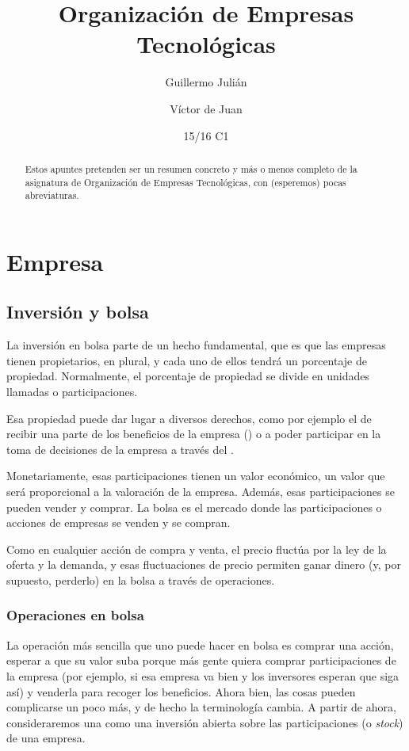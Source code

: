 \documentclass[nochap,palatino,notitlepage]{apuntes}
\title{Organización de Empresas Tecnológicas}
\author{Guillermo Julián \and Víctor de Juan}
\date{15/16 C1}
\begin{document}
\pagestyle{plain}
\maketitle

\begin{abstract}
Estos apuntes pretenden ser un resumen concreto y más o menos completo de la asignatura de Organización de Empresas Tecnológicas, con (esperemos) pocas abreviaturas.
\end{abstract}

\tableofcontents
\newpage
\section{Empresa}

\subsection{Inversión y bolsa}

La inversión en bolsa parte de un hecho fundamental, que es que las empresas tienen propietarios, en plural, y cada uno de ellos tendrá un porcentaje de propiedad. Normalmente, el porcentaje de propiedad se divide en unidades llamadas  o participaciones.

Esa propiedad puede dar lugar a diversos derechos, como por ejemplo el de recibir una parte de los beneficios de la empresa () o a poder participar en la toma de decisiones de la empresa a través del .

Monetariamente, esas participaciones tienen un valor económico, un valor que será proporcional a la valoración de la empresa. Además, esas participaciones se pueden vender y comprar. La bolsa es el mercado donde las participaciones o acciones de empresas se venden y se compran.

Como en cualquier acción de compra y venta, el precio fluctúa por la ley de la oferta y la demanda, y esas fluctuaciones de precio permiten ganar dinero (y, por supuesto, perderlo) en la bolsa a través de operaciones.

\subsubsection{Operaciones en bolsa}

La operación más sencilla que uno puede hacer en bolsa es comprar una acción, esperar a que su valor suba porque más gente quiera comprar participaciones de la empresa (por ejemplo, si esa empresa va bien y los inversores esperan que siga así) y venderla para recoger los beneficios. Ahora bien, las cosas pueden complicarse un poco más, y de hecho la terminología cambia. A partir de ahora, consideraremos una  como una inversión abierta sobre las participaciones (o \textit{stock}) de una empresa.
\end{document}
